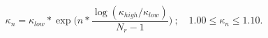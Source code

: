 \begin{center}
    \begin{equation}
        \kappa_{n}=\kappa_{low}*\exp{ \biggl(n*\frac{\log(\kappa_{high}/\kappa_{low})}{N_{r}-1}\biggr)} \ ; \quad 1.00 \leq \kappa_{n} \leq 1.10.
    \label{eq:kappa_scaling}
    \end{equation}
\end{center}